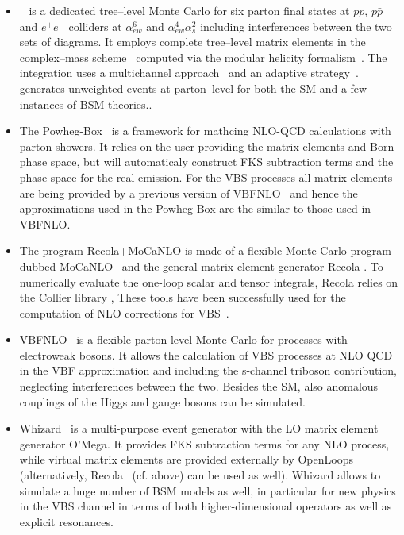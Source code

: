 \begin{itemize}
  \item {{}~\cite{Ballestrero:2007xq} is a dedicated tree--level Monte Carlo for six parton final states at $pp,\, p\bar{p}$
  and $e^+e^-$ colliders at $\alpha_{ew}^6$ and $\alpha_{ew}^4\alpha_s^2$ including interferences between the two sets of diagrams.
It employs complete tree--level matrix elements in the complex--mass scheme~\cite{Denner:2006ic} computed via the modular helicity 
formalism~\cite{Ballestrero:1999md,Ballestrero:1994jn}. The integration uses a multichannel approach~\cite{BERENDS1985441} and an adaptive
strategy~\cite{PETERLEPAGE1978192}. {} generates unweighted events at parton--level for both the SM and a few instances of BSM theories.}.       

  \item The {\sc Powheg-Box}~\cite{Alioli:2010xd,Frixione:2007vw} is a framework for mathcing NLO-QCD calculations with parton showers.
It relies on the user providing the matrix elements and Born phase space, but will automaticaly construct FKS \cite{Frixione:1995ms} subtraction terms and the phase space for the real emission.
For the VBS processes all matrix elements are being provided by a previous version of {\sc VBFNLO}~\cite{Arnold:2008rz, Arnold:2011wj, Baglio:2014uba} and hence the approximations used in the {\sc Powheg-Box} are the similar to those used in {\sc VBFNLO}.

  \item The program {\sc Recola+MoCaNLO} is made of a flexible Monte Carlo program dubbed {\sc MoCaNLO}~\cite{MoCaNLO} and the general matrix element generator {\sc Recola} \cite{Actis:2012qn,Actis:2016mpe}.
To numerically evaluate the one-loop scalar and tensor integrals, {\sc Recola} relies on the {\sc Collier} library \cite{Denner:2014gla,Denner:2016kdg},
These tools have been successfully used for the computation of NLO corrections for VBS~\cite{Biedermann:2016yds,Biedermann:2017bss}.

  \item {\sc VBFNLO}~\cite{Arnold:2008rz, Arnold:2011wj, Baglio:2014uba} is a flexible
parton-level Monte Carlo for processes with electroweak bosons. It
allows the calculation of VBS processes at NLO QCD in the VBF
approximation and including the s-channel triboson contribution,
neglecting interferences between the two. Besides the SM, also anomalous
couplings of the Higgs and gauge bosons can be simulated.

  \item {\sc Whizard}~\cite{Moretti:2001zz,Kilian:2007gr} is a multi-purpose
event generator with the LO matrix element generator {\sc O'Mega}. It
provides FKS subtraction terms for any NLO process, while virtual matrix
elements are provided externally by {\sc
OpenLoops}~\cite{Cascioli:2011va} (alternatively, {\sc Recola}~\cite{Actis:2012qn,Actis:2016mpe}
(cf. above) can be used as well). {\sc Whizard} allows to simulate a
huge number of BSM models as well, in particular for new physics in
the VBS channel in terms of both higher-dimensional operators as well as explicit
resonances.

\end{itemize}

